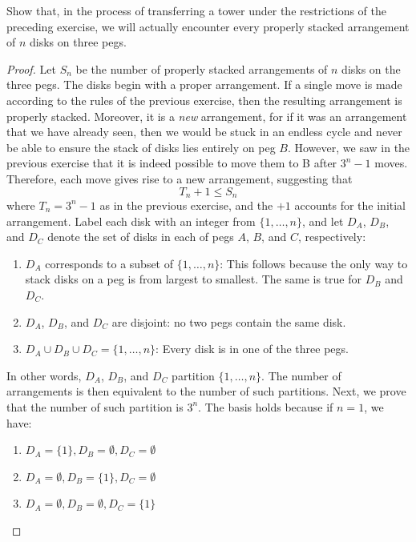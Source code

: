 \documentclass[12pt]{article}
\newenvironment{ex}[2][Exercise]{\begin{trivlist}
		\item[\hskip \labelsep {\bfseries #1}\hskip \labelsep {\bfseries #2.}]}{\end{trivlist}}
\newenvironment{sol}[1][Solution]{\begin{trivlist}
		\item[\hskip \labelsep {\bfseries #1:}]}{\end{trivlist}}
\begin{document}
\begin{ex}{3}
	Show that, in the process of transferring a tower under the
	restrictions of the preceding exercise, we will actually encounter every properly
	stacked arrangement of $n$ disks on three pegs.
\end{ex}

\begin{sol}
	\begin{proof}
		Let $S_n$ be the number of properly stacked arrangements of $n$ disks on
		the three pegs. The disks begin with a proper arrangement. If a single move
		is made according to the rules of the previous exercise, then the resulting
		arrangement is properly stacked. Moreover, it is a \emph{new} arrangement, for
		if it was an arrangement that we have already seen, then we would be stuck
		in an endless cycle and never be able to ensure the stack of disks lies
		entirely on peg $B$. However, we saw in the previous exercise that it is
		indeed possible to move them to B after $3^n-1$ moves. Therefore, each move gives rise
		to a new arrangement, suggesting that
		\[
		T_n+1\leq S_n
		\]
		where $T_n=3^n-1$ as in the previous exercise, and the $+1$ accounts for
		the initial arrangement. Label each disk with an integer from $\{1,\ldots, n\}$,
		and let $D_A$, $D_B$, and $D_C$ denote the set of disks in each of pegs $A$,
		$B$, and $C$, respectively:
		\begin{enumerate}
			\item $D_A$ corresponds to a subset of $\{1, \ldots, n\}$: This follows
			because the only way to stack disks on a peg is from largest to smallest.
			The same is true for $D_B$ and $D_C$.
			\item $D_A$, $D_B$, and $D_C$ are disjoint: no two pegs contain the
			same disk.
			\item $D_A\cup D_B\cup D_C=\{1,\ldots,n\}$: Every disk is in one
			of the three pegs.
		\end{enumerate}
		In other words, $D_A$, $D_B$, and $D_C$ partition $\{1,\ldots, n\}$. The
		number of arrangements is then equivalent to the number of such partitions.
		Next, we prove that the number of such partition is $3^n$. The basis holds
		because if $n=1$, we have:
		\begin{enumerate}
			\item $D_A=\{1\}, D_B=\emptyset, D_C=\emptyset$
			\item $D_A=\emptyset, D_B=\{1\}, D_C=\emptyset$
			\item $D_A=\emptyset, D_B=\emptyset, D_C=\{1\}$

\end{enumerate}
\end{proof}
\end{sol}
\end{document}
